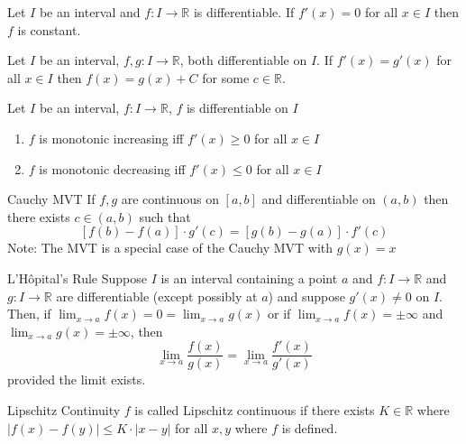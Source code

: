 \documentclass[12pt]{article}
\begin{document}
\begin{corollary}{}{}
    Let $ I $ be an interval and $ f : I \to \mathbb{R} $ is differentiable. If $ f' \left( x \right) = 0 $ for all $ x \in I $ then $ f $ is constant.
\end{corollary}
\begin{corollary}{}{}
    Let $ I $ be an interval, $ f, g : I \to \mathbb{R} $, both differentiable on $ I $. If $ f' \left( x \right) = g' \left( x \right) $ for all $ x \in I $ then $ f \left( x \right) = g \left( x \right) + C $ for some $ c \in \mathbb{R} $.
\end{corollary}
\begin{corollary}{}{}
    Let $ I $ be an interval, $ f: I \to \mathbb{R} $, $ f $ is differentiable on $ I $
    \begin{enumerate}[label=(\roman*)]
        \item $ f $ is monotonic increasing iff $ f' \left( x \right) \geq 0 $ for all $ x \in I $
        \item $ f $ is monotonic decreasing iff $ f' \left( x \right) \leq 0 $ for all $ x \in I $
    \end{enumerate}
\end{corollary}
\begin{theorem}{Cauchy MVT}{}
    If $ f, g $ are continuous on $ \left[ a, b \right] $ and differentiable on $ \left( a, b \right) $ then there exists $ c \in \left( a, b \right) $ such that
    \[ \left[ f \left( b \right) - f \left( a \right) \right] \cdot g' \left( c \right) = \left[ g \left( b \right) - g \left( a \right) \right] \cdot f' \left( c \right) \]
    Note: The MVT is a special case of the Cauchy MVT with $ g \left( x \right) = x $
\end{theorem}
\begin{theorem}{L'Hôpital's Rule}{}
    Suppose $ I $ is an interval containing a point $ a $ and $ f: I \to \mathbb{R} $ and $ g: I \to \mathbb{R} $ are differentiable (except possibly at $ a $) and suppose $ g' \left( x \right) \neq 0 $ on $ I $. Then, if $ \lim_{x \to a} f \left( x \right) = 0 = \lim_{x \to a} g \left( x \right) $ or if $ \lim_{x \to a} f \left( x \right) = \pm \infty $ and $ \lim_{x \to a} g \left( x \right) = \pm \infty $, then
    \[ \lim_{x \to a} \frac{f \left( x \right)}{g \left( x \right)} = \lim_{x \to a} \frac{f' \left( x \right)}{g' \left( x \right)} \]
    provided the limit exists.
\end{theorem}
\begin{definition}{Lipschitz Continuity}{}
    $ f $ is called Lipschitz continuous if there exists $ K \in \mathbb{R} $ where $ | f \left( x \right) - f \left( y \right) | \leq K \cdot | x - y | $ for all $ x, y $ where $ f $ is defined.
\end{definition}
\end{document}
